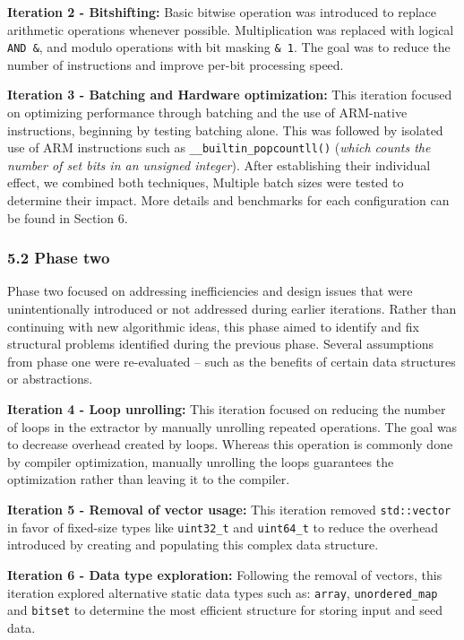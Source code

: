 \textbf{Iteration 2 - Bitshifting:} Basic bitwise operation was introduced to replace arithmetic operations whenever possible. Multiplication was replaced with logical \texttt{AND\ \&}, and modulo operations with bit masking \texttt{\&\ 1}. The goal was to reduce the number of instructions and improve per-bit processing speed.

\textbf{Iteration 3 - Batching and Hardware optimization:} This iteration focused on optimizing performance through batching and the use of ARM-native instructions, beginning by testing batching alone. This was followed by isolated use of ARM instructions such as \texttt{\_\_builtin\_popcountll()} (\emph{which counts the number of set bits in an unsigned integer}). After establishing their individual effect, we combined both techniques, Multiple batch sizes were tested to determine their impact. More details and benchmarks for each configuration can be found in Section 6.

\subsubsection{5.2 Phase two}\label{phase-two}

Phase two focused on addressing inefficiencies and design issues that were unintentionally introduced or not addressed during earlier iterations. Rather than continuing with new algorithmic ideas, this phase aimed to identify and fix structural problems identified during the previous phase. Several assumptions from phase one were re-evaluated -- such as the benefits of certain data structures or abstractions.

\textbf{Iteration 4 - Loop unrolling:} This iteration focused on reducing the number of loops in the extractor by manually unrolling repeated operations. The goal was to decrease overhead created by loops. Whereas this operation is commonly done by compiler optimization, manually unrolling the loops guarantees the optimization rather than leaving it to the compiler.

\textbf{Iteration 5 - Removal of vector usage:} This iteration removed \texttt{std::vector} in favor of fixed-size types like \texttt{uint32\_t} and \texttt{uint64\_t} to reduce the overhead introduced by creating and populating this complex data structure.

\textbf{Iteration 6 - Data type exploration:} Following the removal of vectors, this iteration explored alternative static data types such as: \texttt{array}, \texttt{unordered\_map} and \texttt{bitset} to determine the most efficient structure for storing input and seed data.

